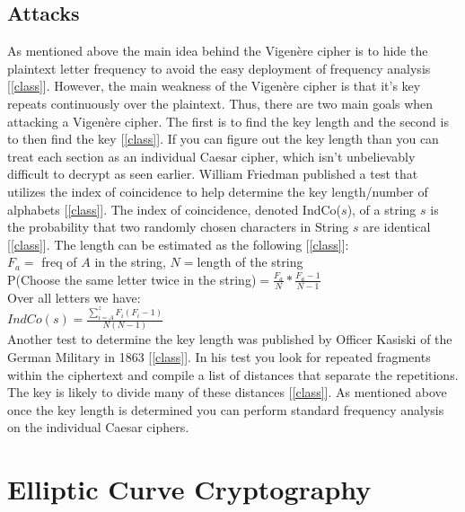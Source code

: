 \documentclass[12pt]{article}
\begin{document}
\subsection{Attacks}
As mentioned above the main idea behind the Vigen\`ere cipher is to hide the plaintext letter frequency to avoid the easy deployment of frequency analysis [\ref{class}]. However, the main weakness of the Vigen\`ere cipher is that it's key repeats continuously over the plaintext. Thus, there are two main goals when attacking a Vigen\`ere cipher. The first is to find the key length and the second is to then find the key [\ref{class}]. If you can figure out the key length than you can treat each section as an individual Caesar cipher, which isn't unbelievably difficult to decrypt as seen earlier. William Friedman published a test that utilizes the index of coincidence to help determine the key length/number of alphabets [\ref{class}]. The index of coincidence, denoted IndCo($s$), of a string $s$ is the probability that two randomly chosen characters in String $s$ are identical [\ref{class}]. The length can be estimated as the following [\ref{class}]:\\
$F_a=$ freq of $A$ in the string, $N=$length of the string
\vspace{2mm}\\
P(Choose the same letter twice in the string)$=\frac{F_a}{N}*\frac{F_a-1}{N-1}$
\vspace{2mm}\\
Over all letters we have:\\
$IndCo(s)= \frac{\sum\limits_{i=A}^z F_i(F_i-1)}{N(N-1)}$
\vspace{5mm}\\
Another test to determine the key length was published by Officer Kasiski of the German Military in 1863 [\ref{class}]. In his test you look for repeated fragments within the ciphertext and compile a list of distances that separate the repetitions. The key is likely to divide many of these distances [\ref{class}]. As mentioned above once the key length is determined you can perform standard frequency analysis on the individual Caesar ciphers.

\section{Elliptic Curve Cryptography}
\end{document}
